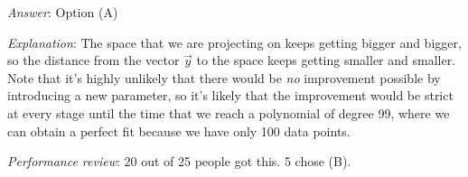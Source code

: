 \documentclass[10pt]{amsart}
\begin{document}
\begin{enumerate}
  {\em Answer}: Option (A)

  {\em Explanation}: The space that we are projecting on keeps getting
  bigger and bigger, so the distance from the vector $\vec{y}$ to the
  space keeps getting smaller and smaller. Note that it's highly
  unlikely that there would be {\em no} improvement possible by
  introducing a new parameter, so it's likely that the improvement
  would be strict at every stage until the time that we reach a
  polynomial of degree 99, where we can obtain a perfect fit because
  we have only 100 data points.

  {\em Performance review}: 20 out of 25 people got this. 5 chose (B).

\end{enumerate}
\end{document}
